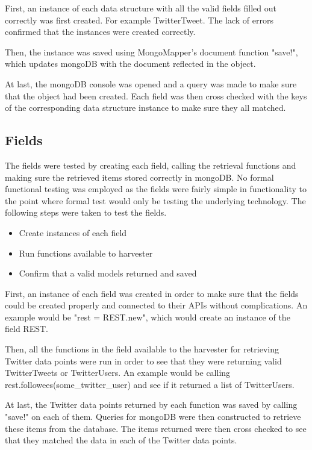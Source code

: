 First, an instance of each data structure with all the valid fields filled out correctly was first created. For example TwitterTweet. The lack of errors confirmed that the instances were created correctly.

Then, the instance was saved using MongoMapper's document function "save!", which updates mongoDB with the document reflected in the object.

At last, the mongoDB console was opened and a query was made to make sure that the object had been created. Each field was then cross checked with the keys of the corresponding data structure instance to make sure they all matched.

\subsection{Fields}
The fields were tested by creating each field, calling the retrieval functions and making sure the retrieved items stored correctly in mongoDB. No formal functional testing was employed as the fields were fairly simple in functionality to the point where formal test would only be testing the underlying technology. The following steps were taken to test the fields.

	\begin{itemize}
	\item Create instances of each field
	\item Run functions available to harvester
	\item Confirm that a valid models returned and saved
	\end{itemize}

First, an instance of each field was created in order to make sure that the fields could be created properly and connected to their APIs without complications. An example would be "rest = REST.new", which would create an instance of the field REST.

Then, all the functions in the field available to the harvester for retrieving Twitter data points were run in order to see that they were returning valid TwitterTweets or TwitterUsers. An example would be calling rest.followees(some\_twitter\_user) and see if it returned a list of TwitterUsers.

At last, the Twitter data points returned by each function was saved by calling "save!" on each of them. Queries for mongoDB were then constructed to retrieve these items from the database. The items returned were then cross checked to see that they matched the data in each of the Twitter data points.

